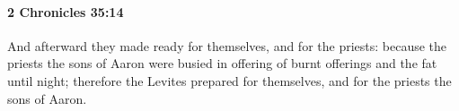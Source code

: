
		\paragraph{2 Chronicles 35:14} %
			\label{2CHRONICLES-35-14}

			And afterward they made ready for themselves, and for the priests: because the priests the sons of Aaron were busied in offering of burnt offerings and the fat until night; therefore the Levites prepared for themselves, and for the priests the sons of Aaron.


